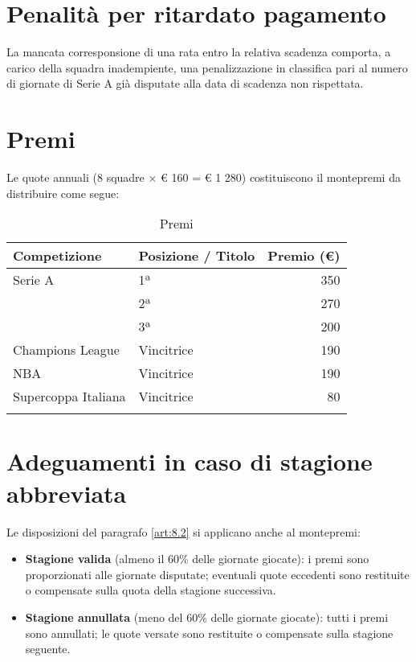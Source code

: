 \section{Penalità per ritardato pagamento}
\label{art:10.2}

La mancata corresponsione di una rata entro la relativa scadenza comporta, a carico della squadra inadempiente, una penalizzazione in classifica pari al numero di giornate di Serie A già disputate alla data di scadenza non rispettata.

\section{Premi}
\label{art:10.3}

Le quote annuali (8 squadre × € 160 = € 1 280) costituiscono il montepremi da distribuire come segue:

\begin{longtable}{|l|l|r|}
\hline
\textbf{Competizione} & \textbf{Posizione / Titolo} & \textbf{Premio (€)} \\
\hline
Serie A & 1ª & 350 \\
        & 2ª & 270 \\
        & 3ª & 200 \\ \hline
Champions League & Vincitrice & 190 \\ \hline
NBA & Vincitrice & 190 \\ \hline
Supercoppa Italiana & Vincitrice & 80 \\ \hline
\caption{Premi}
\end{longtable}

\section{Adeguamenti in caso di stagione abbreviata}
\label{art:10.4}

\noindent
Le disposizioni del paragrafo \ref{art:8.2} si applicano anche al montepremi:

\begin{itemize}
\item \textbf{Stagione valida} (almeno il 60\% delle giornate giocate): i premi sono proporzionati alle giornate disputate; eventuali quote eccedenti sono restituite o compensate sulla quota della stagione successiva.
\item \textbf{Stagione annullata} (meno del 60\% delle giornate giocate): tutti i premi sono annullati; le quote versate sono restituite o compensate sulla stagione seguente.
\end{itemize}

